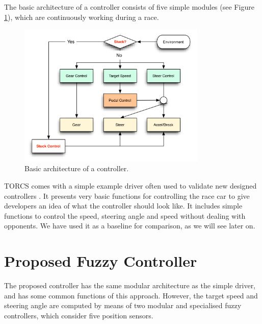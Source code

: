 \documentclass[runningheads,a4paper]{llncs}
\begin{document}
	The basic architecture of a controller consists of five simple modules (see Figure \ref{archi}), which are continuously working during a race. 
	
	\begin{figure}
		
		\centering
		\includegraphics[width=0.8\textwidth]{fig/archicontrole-new.png}
		\begin{minipage}{10cm}
			\centering
			\caption{\footnotesize Basic architecture of a controller.}
			\label{archi}
		\end{minipage} 	
	\end{figure}
	
	TORCS comes with a simple example driver often used to validate new
	designed controllers \cite{CarRacing_Pelta09,torcs2}. It presents very basic
	functions for controlling the race car to give developers an idea of
	what the controller should look like. It includes simple functions to
	control the speed, steering angle and speed without dealing with
	opponents. We have used it as a baseline for comparison, as we will
	see later on.
	
	
	\section{Proposed Fuzzy Controller}
	\label{sec:fuzzy_controller}
	
	The proposed controller has the same modular architecture as the simple driver, and has some common functions of this approach. 
	However, the target speed and steering angle are computed by means of two modular and specialised fuzzy controllers, which consider five position sensors.
	
\end{document}
